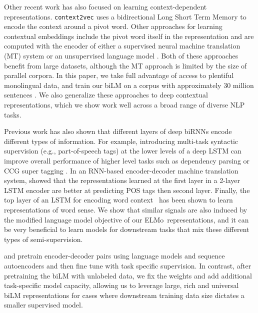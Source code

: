 \documentclass[11pt,a4paper]{article}
\newcommand{\ELMO}{ELMo}
\begin{document}
Other recent work has also focused on learning context-dependent representations.
\texttt{context2vec} \citep{Melamud2016context2vecLG} uses a bidirectional Long Short Term Memory \citep[LSTM; ][]{LSTM:Hochreiter1997} to encode the context around a pivot word. Other approaches for learning contextual embeddings include the pivot word itself in the representation and are computed with the encoder of either a supervised neural machine translation (MT) system \citep[CoVe; ][]{McCann2017LearnedIT} or an unsupervised language model \citep{Peters2017SemisupervisedST}.
Both of these approaches benefit from large datasets, although the MT approach is limited by the size of parallel corpora.
In this paper, we take full advantage of access to plentiful monolingual data, and train our biLM 
on a corpus with approximately 30 million sentences \citep{Chelba2014OneBW}.
We also generalize these approaches to deep contextual representations, which we show work well across a broad range of diverse NLP tasks. 

Previous work has also shown that different layers of deep biRNNs encode different types of information.
For example, introducing multi-task syntactic supervision (e.g., part-of-speech tags) at the lower levels of a deep LSTM can improve overall performance of higher level tasks such as dependency parsing \citep{joint-many-iclr07} or CCG super tagging \citep{Sgaard2016DeepML}.
In an RNN-based encoder-decoder machine translation system, \citet{Belinkov2017WhatDN} showed that the representations learned at the first layer
in a 2-layer LSTM encoder are better at predicting POS tags then second layer.
Finally, the top layer of an LSTM for encoding word context~\citep{Melamud2016context2vecLG} has been shown to learn representations of word sense. We show that similar signals are also induced by the modified language model objective of our \ELMO\ representations, and it can be very beneficial to learn models for downstream tasks that mix these different types of semi-supervision. 

\citet{Dai2015SemisupervisedSL} and \citet{Ramachandran2017ImproveSeq2SeqLMGal2016ATG} pretrain encoder-decoder pairs
using language models and sequence autoencoders 
and then fine tune with task specific supervision.
In contrast, after pretraining the biLM with unlabeled data, we fix the weights and add additional task-specific model capacity, allowing us to leverage large, rich and universal biLM representations for cases where downstream training data size dictates a smaller supervised model.
\end{document}
